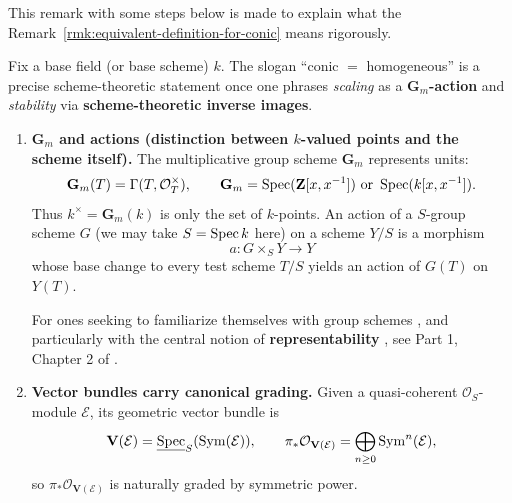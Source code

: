 \begin{remark}
    \mbox{}

    This remark with some steps below is made to explain what the Remark~\ref{rmk:equivalent-definition-for-conic} means rigorously.

    Fix a base field (or base scheme) $k$.  The slogan ``conic $=$ homogeneous'' is a precise
    scheme-theoretic statement once one phrases \emph{scaling} as a \textbf{$\mathbf G_m$-action} and
    \emph{stability} via \textbf{scheme-theoretic inverse images}.

    \begin{enumerate}
        \item \textbf{$\mathbf G_m$ and actions (distinction between $k$-valued points and the scheme itself).}
              The multiplicative group scheme $\mathbf G_m$ represents units:
              \[
                  \mathbf G_m(T)=\Gamma(T,\mathcal O_T^\times),\qquad
                  \mathbf G_m=\operatorname{Spec}(\mathbf Z[x,x^{-1}])\text{ or } \operatorname{Spec}(k[x,x^{-1}]) .
              \]
              Thus $k^\times=\mathbf G_m(k)$ is only the set of $k$-points.
              An action of a $S$-group scheme $G$ (we may take $S=\operatorname{Spec} k$ here) on a scheme $Y/S$ is a morphism
              \[
                  a:G\times_S Y\to Y
              \]
              whose base change to every test scheme $T/S$ yields an action of $G(T)$ on $Y(T)$.
              \cite[\href{https://stacks.math.columbia.edu/tag/022U}{Tag 022U}, \href{https://stacks.math.columbia.edu/tag/022Z}{Tag 022Z}]{stacks-project}

              For ones seeking to familiarize themselves with group schemes \cite[\href{https://stacks.math.columbia.edu/tag/022S}{Tag 022S}]{stacks-project}, and particularly with the central notion of \textbf{representability} \cite[\href{https://stacks.math.columbia.edu/tag/022N}{Tag 022N}]{stacks-project}, see Part 1, Chapter 2 of \cite{Mihatsch2024EllipticCurvesModuli}.

        \item \textbf{Vector bundles carry canonical grading.}
              Given a quasi-coherent $\mathcal O_S$-module $\mathcal E$, its geometric vector bundle is
              \[
                  \mathbf V(\mathcal E)=\underline{\operatorname{Spec}}_S(\mathrm{Sym}(\mathcal E)),
                  \qquad
                  \pi_*\mathcal O_{\mathbf V(\mathcal E)}=\bigoplus_{n\ge 0}\mathrm{Sym}^n(\mathcal E),
              \]
              so $\pi_*\mathcal O_{\mathbf V(\mathcal E)}$ is naturally graded by symmetric power.
              \cite[\href{https://stacks.math.columbia.edu/tag/01M1}{Tag 01M1}]{stacks-project}


\end{enumerate}
\end{remark}
